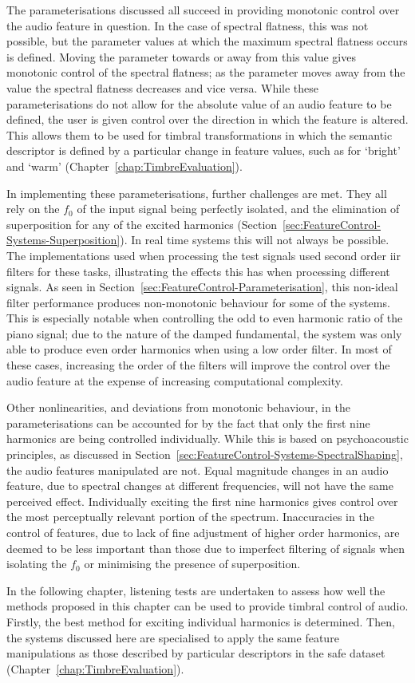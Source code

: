 	The parameterisations discussed all succeed in providing monotonic control over the audio feature in question. In
	the case of spectral flatness, this was not possible, but the parameter values at which the maximum spectral
	flatness occurs is defined.  Moving the parameter towards or away from this value gives monotonic control of the
	spectral flatness; as the parameter moves away from the value the spectral flatness decreases and vice versa. While
	these parameterisations do not allow for the absolute value of an audio feature to be defined, the user is given
	control over the direction in which the feature is altered. This allows them to be used for timbral transformations
	in which the semantic descriptor is defined by a particular change in feature values, such as for `bright' and
	`warm' (Chapter~\ref{chap:TimbreEvaluation}).
	
	In implementing these parameterisations, further challenges are met. They all rely on the $f_{0}$ of the input
	signal being perfectly isolated, and the elimination of superposition for any of the excited harmonics
	(Section~\ref{sec:FeatureControl-Systems-Superposition}). In real time systems this will not always be possible.
	The implementations used when processing the test signals used second order \acrshort{iir} filters for these tasks,
	illustrating the effects this has when processing different signals. As seen in
	Section~\ref{sec:FeatureControl-Parameterisation}, this non-ideal filter performance produces non-monotonic
	behaviour for some of the systems. This is especially notable when controlling the odd to even harmonic ratio of
	the piano signal; due to the nature of the damped fundamental, the system was only able to produce even order
	harmonics when using a low order filter. In most of these cases, increasing the order of the filters will improve
	the control over the audio feature at the expense of increasing computational complexity.

	Other nonlinearities, and deviations from monotonic behaviour, in the parameterisations can be accounted for by the
	fact that only the first nine harmonics are being controlled individually. While this is based on psychoacoustic
	principles, as discussed in Section~\ref{sec:FeatureControl-Systems-SpectralShaping}, the audio features
	manipulated are not. Equal magnitude changes in an audio feature, due to spectral changes at different frequencies,
	will not have the same perceived effect. Individually exciting the first nine harmonics gives control over the most
	perceptually relevant portion of the spectrum. Inaccuracies in the control of features, due to lack of fine
	adjustment of higher order harmonics, are deemed to be less important than those due to imperfect filtering of
	signals when isolating the $f_{0}$ or minimising the presence of superposition.

	In the following chapter, listening tests are undertaken to assess how well the methods proposed in this chapter
	can be used to provide timbral control of audio. Firstly, the best method for exciting individual harmonics is
	determined. Then, the systems discussed here are specialised to apply the same feature manipulations as those
	described by particular descriptors in the \acrshort{safe} dataset (Chapter~\ref{chap:TimbreEvaluation}).
